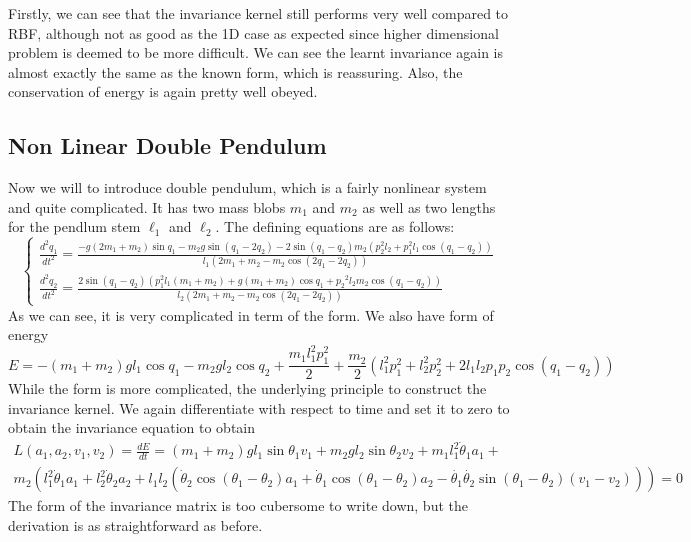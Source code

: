 \documentclass{statsmsc}
\begin{document}
Firstly, we can see that the invariance kernel still performs very well compared to RBF, although not as good as the 1D case as expected since higher dimensional problem is deemed to be more difficult.
We can see the learnt invariance again is almost exactly the same as the known form, which is reassuring.
Also, the conservation of energy is again pretty well obeyed.

\subsection{Non Linear Double Pendulum}
Now we will to introduce double pendulum, which is a fairly nonlinear system and quite complicated. 
It has two mass blobs $m_1$ and $m_2$ as well as two lengths for the pendlum stem $\ell_1$ and $\ell_2$.
The defining equations are as follows:
$$
\begin{cases}
\frac{d^2q_1}{dt^2}=\frac{-g\left(2 m_{1}+m_{2}\right) \sin q_1-m_{2} g \sin \left(q_1-2 q_2\right)-2 \sin \left(q_1-q_2\right) m_{2}\left(p_2^{2} l_{2}+p_1^{2} l_{1} \cos \left(q_1-q_2\right)\right)}{l_{1}\left(2 m_{1}+m_{2}-m_{2} \cos \left(2 q_1-2 q_2\right)\right)} \\
\frac{d^2q_2}{dt^2}=\frac{2 \sin \left(q_1-q_2\right)\left(p_1^{2} l_{1}\left(m_{1}+m_{2}\right)+g\left(m_{1}+m_{2}\right) \cos q_1+p_2{ }^{2} l_{2} m_{2} \cos \left(q_1-q_2\right)\right)}{l_{2}\left(2 m_{1}+m_{2}-m_{2} \cos \left(2 q_1-2 q_2\right)\right)}
\end{cases}
$$
As we can see, it is very complicated in term of the form.
We also have form of energy 
$$
E = -(m_1+m_2)gl_1\cos q_1-m_2gl_2\cos q_2+ \frac{m_1l^2_1p_1^2}{2}+\frac{m_2}{2}(l^2_1p_1^2+l^2_2p_2^2+2l_1l_2p_1p_2\cos(q_1-q_2))
$$
While the form is more complicated, the underlying principle to construct the invariance kernel. 
We again differentiate with respect to time and set it to zero to obtain the invariance equation to obtain 
\begin{gather*}
L(a_1, a_2, v_1, v_2)=\frac{dE}{dt} = (m_1+m_2)gl_1\sin\theta_1v_1+m_2gl_2\sin\theta_2v_2+m_1l_1^2\dot{\theta}_1a_1+\\m_2(l_1^2\dot{\theta}_1a_1+l_2^2\dot{\theta}_2a_2+l_1l_2(\dot{\theta}_2\cos(\theta_1-\theta_2)a_1+\dot{\theta}_1\cos(\theta_1-\theta_2)a_2-\dot{\theta_1}\dot{\theta_2}\sin(\theta_1-\theta_2)(v_1-v_2)))=0
\end{gather*}
The form of the invariance matrix is too cubersome to write down, but the derivation is as straightforward as before. 
\end{document}
